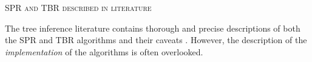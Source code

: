\documentclass[12pt,letterpaper]{article}
\renewcommand{\section}[1]{%
\bigskip
\begin{center}
\begin{Large}
\normalfont\scshape #1
\medskip
\end{Large}
\end{center}}
\begin{document}
\section{SPR and TBR described in literature}
The tree inference literature contains thorough and precise descriptions of both the SPR and TBR algorithms \citep[e.g.][]{allen2001subtree,felsenstein2004inferring} and their caveats \citep[i.e speed and reliability - e.g.][]{morrison2007increasing,lakner2008efficiency,goloboff2014bias}.
However, the description of the \textit{implementation} of the algorithms is often overlooked.
\end{document}
